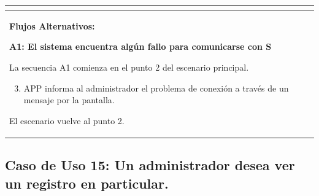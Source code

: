 \begin{longtable}{|l|p{5.5cm}|l|p{2cm}|l|p{1.9cm}|}
{    } \\ \hline

    \multicolumn{6}{|p{15cm}|}{ \textbf{Flujos Alternativos: }
    
    \textbf{A1: El sistema encuentra algún fallo para comunicarse con S}
    
    La secuencia A1 comienza en el punto 2 del escenario principal.
    \begin{enumerate}
        \setcounter{enumi}{2}
        \item APP informa al administrador el problema de conexión a través de un mensaje por la pantalla.
    \end{enumerate}

    El escenario vuelve al punto 2.

    } \\ \hline

\end{longtable}


\subsection{Caso de Uso 15: Un administrador desea ver un registro en particular.}

